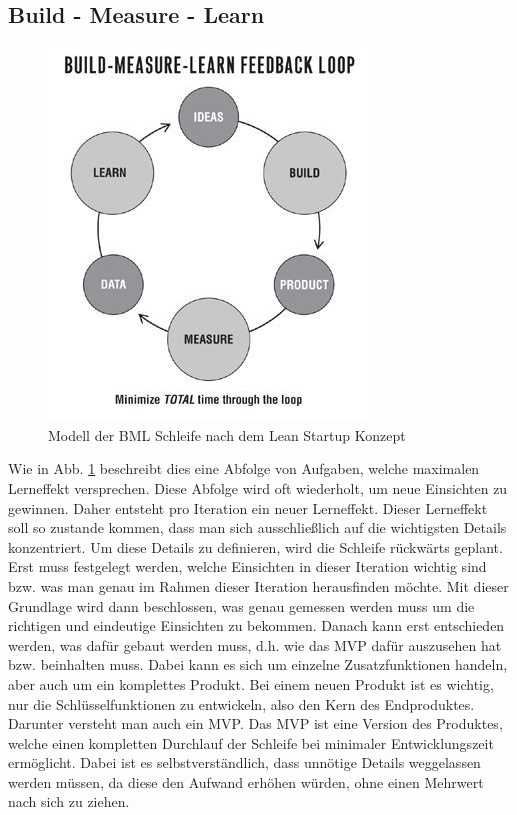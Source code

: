 \subsection*{Build - Measure - Learn}
\begin{figure}
	\begin{center}
		\includegraphics[scale=1]{99_IMG/02_Grundlagen/buildmeasurelearn.jpg}
		\caption{Modell der \ac{BML} Schleife nach dem Lean Startup Konzept}
		\label{LeanStartup_BuildMeasureLearn}
	\end{center}
\end{figure}
Wie in Abb. \ref{LeanStartup_BuildMeasureLearn} beschreibt dies eine Abfolge von Aufgaben, welche maximalen Lerneffekt versprechen. Diese Abfolge wird oft wiederholt, um neue Einsichten zu gewinnen. Daher entsteht pro Iteration ein neuer Lerneffekt. Dieser Lerneffekt soll so zustande kommen, dass man sich ausschließlich auf die wichtigsten Details konzentriert. Um diese Details zu definieren, wird die Schleife rückwärts geplant. Erst muss festgelegt werden, welche Einsichten in dieser Iteration wichtig sind bzw. was man genau im Rahmen dieser Iteration herausfinden möchte. Mit dieser Grundlage wird dann beschlossen, was genau gemessen werden muss um die richtigen und eindeutige Einsichten zu bekommen. Danach kann erst entschieden werden, was dafür gebaut werden muss, d.h. wie das \ac{MVP} dafür auszusehen hat bzw. beinhalten muss. Dabei kann es sich um einzelne Zusatzfunktionen handeln, aber auch um ein komplettes Produkt. Bei einem neuen Produkt ist es wichtig, nur die Schlüsselfunktionen zu entwickeln, also den Kern des Endproduktes. Darunter versteht man auch ein \ac{MVP}. Das \ac{MVP} ist eine Version des Produktes, welche einen kompletten Durchlauf der Schleife bei minimaler Entwicklungszeit ermöglicht. Dabei ist es selbstverständlich, dass unnötige Details weggelassen werden müssen, da diese den Aufwand erhöhen würden, ohne einen Mehrwert nach sich zu ziehen.

